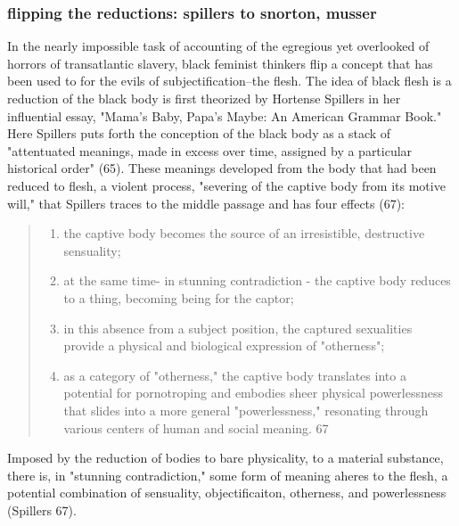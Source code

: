 \documentclass[11pt]{article}
\begin{document}
\subsubsection{flipping the reductions: spillers to snorton, musser}
\label{sec:org460fa2f}
In the nearly impossible task of accounting of the egregious yet
overlooked of horrors of transatlantic slavery, black feminist
thinkers flip a concept that has been used to for the evils of
subjectification--the flesh. The idea of black flesh is a reduction of
the black body is first theorized by Hortense Spillers in her
influential essay, "Mama's Baby, Papa's Maybe: An American Grammar
Book." Here Spillers puts forth the conception of the black body as a
stack of "attentuated meanings, made in excess over time, assigned by
a particular historical order" (65). These meanings developed from the
body that had been reduced to flesh, a violent process, "severing of
the captive body from its motive will," that Spillers traces to the
middle passage and has four effects (67):
\begin{quote}
\begin{enumerate}
\item the captive body becomes the source of an irresistible, destructive
sensuality;
\item at the same time- in stunning contradiction - the captive body
reduces to a thing, becoming being for the captor;
\item in this absence from a subject position, the captured sexualities
provide a physical and biological expression of "otherness";
\item as a category of "otherness," the captive body translates into a
potential for pornotroping and embodies sheer physical
powerlessness that slides into a more general "powerlessness,"
resonating through various centers of human and social meaning. 67
\end{enumerate}
\end{quote}
Imposed by the reduction of bodies to bare physicality, to a material
substance, there is, in "stunning contradiction," some form
of meaning aheres to the flesh, a potential combination of sensuality,
objectificaiton, otherness, and powerlessness (Spillers 67).
\end{document}
